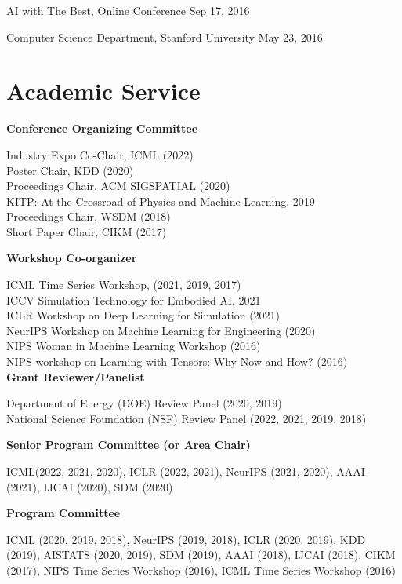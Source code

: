 \documentclass[margin,line]{res}
\begin{document}
\begin{resume}
 
 AI with The Best, Online Conference \hfill {Sep 17, 2016}
 
 
Computer Science Department,  Stanford University  \hfill {May 23, 2016}
 
 


\section{\sc Academic Service}


{\bf Conference Organizing Committee}

Industry Expo Co-Chair, ICML (2022)\\
Poster Chair, KDD (2020) \\
Proceedings Chair, ACM SIGSPATIAL (2020) \\
KITP: At the Crossroad of Physics and Machine Learning,  2019\\
Proceedings Chair, WSDM (2018)\\
Short Paper Chair, CIKM (2017)

{\bf Workshop Co-organizer}

ICML Time Series  Workshop, (2021, 2019, 2017) \\
ICCV Simulation Technology for Embodied AI, 2021\\
ICLR Workshop on Deep  Learning for Simulation (2021) \\
NeurIPS  Workshop on Machine Learning for Engineering (2020)\\
NIPS Woman in Machine Learning Workshop (2016) \\
NIPS workshop on Learning with Tensors: Why Now and How? (2016) \\




{\bf Grant Reviewer/Panelist}

 Department of Energy (DOE) Review Panel (2020, 2019) \\
National Science Foundation (NSF) Review Panel (2022, 2021, 2019, 2018)



{\bf Senior Program Committee (or Area Chair)}

 ICML(2022, 2021, 2020), ICLR (2022, 2021), NeurIPS (2021, 2020), AAAI (2021), IJCAI (2020), SDM (2020)

{\bf Program Committee}

ICML (2020, 2019, 2018), NeurIPS (2019, 2018), ICLR (2020, 2019), KDD (2019), AISTATS (2020, 2019), SDM (2019), AAAI (2018), IJCAI (2018), CIKM (2017), NIPS Time Series Workshop (2016), ICML Time Series Workshop (2016)



\end{resume}
\end{document}
